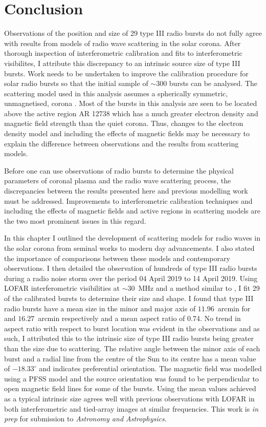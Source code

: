 \section{Conclusion}
Observations of the position and size of 29 type III radio bursts do not fully agree with results from models of radio wave scattering in the solar corona. After thorough inspection of interferometric calibration and fits to interferometric visibilites, I attribute this discrepancy to an intrinsic source size of type III bursts. Work needs to be undertaken to improve the calibration procedure for solar radio bursts so that the initial sample of $\sim 300$ bursts can be analysed. 
The scattering model used in this analysis assumes a spherically symmetric, unmagnetised, corona \citep{Kontar2019, Zhang2021}. Most of the bursts in this analysis are seen to be located above the active region AR 12738 which has a much greater electron density and magnetic field strength than the quiet corona. Thus, changes to the electron density model and including the effects of magnetic fields may be necessary to explain the difference between observations and the results from scattering models.

Before one can use observations of radio bursts to determine the physical parameters of coronal plasma and the radio wave scattering process, the discrepancies between the results presented here and previous modelling work must be addressed. Improvements to interferometric calibration techniques and including the effects of magnetic fields and active regions in scattering models are the two most prominent issues in this regard. %

In this chapter I outlined the development of scattering models for radio waves in the solar corona from seminal works to modern day advancements. I also stated the importance of comparisons between these models and contemporary observations. I then detailed the observation of hundreds of type III radio bursts during a radio noise storm over the period 04 April 2019 to 14 April 2019. Using LOFAR interferometric visibilities at $\sim 30$~MHz and a method similar to \cite{Murphy2021}, I fit 29 of the calibrated bursts to determine their size and shape. I found that type III radio bursts have a mean size in the minor and major axis of $11.96$~arcmin for and $16.27$~arcmin respectively and a mean aspect ratio of 0.74. No trend in aspect ratio with respect to burst location was evident in the observations and as such, I attributed this to the intrinsic size of type III radio bursts being greater than the size due to scattering. The relative angle between the minor axis of each burst and a radial line from the centre of the Sun to its centre has a mean value of $-18.33^\circ$ and indicates preferential orientation. The magnetic field was modelled using a PFSS model and the source orientation was found to be perpendicular to open magnetic field lines for some of the bursts. Using the mean values achieved as a typical intrinsic size agrees well with previous observations with LOFAR in both interferometric and tied-array images at similar frequencies. This work is \textit{in prep} for submission to \textit{Astronomy and Astrophysics}.
